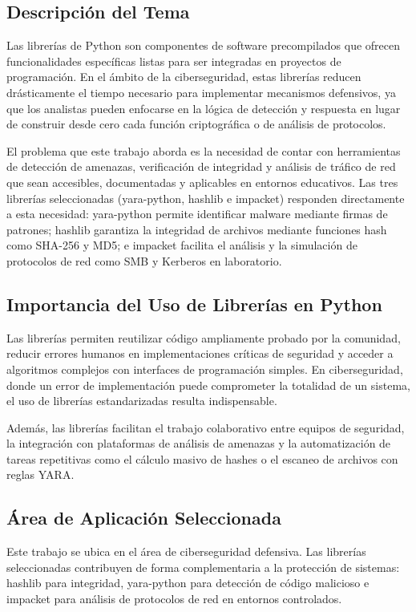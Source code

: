 \documentclass[12pt,a4paper]{article}
\begin{document}
\subsection{Descripción del Tema}

Las librerías de Python son componentes de software precompilados que
ofrecen funcionalidades específicas listas para ser integradas en
proyectos de programación. En el ámbito de la ciberseguridad, estas
librerías reducen drásticamente el tiempo necesario para implementar
mecanismos defensivos, ya que los analistas pueden enfocarse en la
lógica de detección y respuesta en lugar de construir desde cero cada
función criptográfica o de análisis de protocolos.

El problema que este trabajo aborda es la necesidad de contar con
herramientas de detección de amenazas, verificación de integridad y
análisis de tráfico de red que sean accesibles, documentadas y
aplicables en entornos educativos. Las tres librerías seleccionadas
(yara-python, hashlib e impacket) responden directamente a esta
necesidad: yara-python permite identificar malware mediante firmas de
patrones; hashlib garantiza la integridad de archivos mediante funciones
hash como SHA-256 y MD5; e impacket facilita el análisis y la simulación
de protocolos de red como SMB y Kerberos en laboratorio.

\subsection{Importancia del Uso de Librerías en Python}

Las librerías permiten reutilizar código ampliamente probado por la
comunidad, reducir errores humanos en implementaciones críticas de
seguridad y acceder a algoritmos complejos con interfaces de
programación simples. En ciberseguridad, donde un error de
implementación puede comprometer la totalidad de un sistema, el uso de
librerías estandarizadas resulta indispensable.

Además, las librerías facilitan el trabajo colaborativo entre equipos de
seguridad, la integración con plataformas de análisis de amenazas y la
automatización de tareas repetitivas como el cálculo masivo de hashes o
el escaneo de archivos con reglas YARA.

\subsection{Área de Aplicación Seleccionada}

Este trabajo se ubica en el área de ciberseguridad defensiva. Las
librerías seleccionadas contribuyen de forma complementaria a la
protección de sistemas: hashlib para integridad, yara-python para
detección de código malicioso e impacket para análisis de protocolos de
red en entornos controlados.
\end{document}
